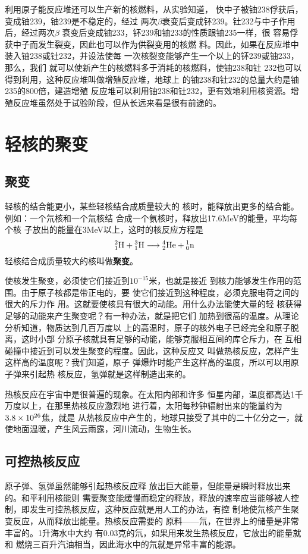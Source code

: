 利用原子能反应堆还可以生产新的核燃料，从实验知道，
快中子被铀238俘获后，变成铀239，铀239是不稳定的，经过
两次$\beta$衰变后变成钚239。钍232与中子作用后，经过两次$\beta$
衰变后变成铀233，钚239和铀233的性质跟铀235一样，很
容易俘获中子而发生裂变，因此也可以作为供裂变用的核燃
料。因此，如果在反应堆中装入铀238或钍232，并设法使每
一次核裂变能够产生一个以上的钚239或铀233，那么，我们
就可以使新产生的核燃料多于消耗的核燃料，使铀238和钍
232也可以得到利用，这种反应堆叫做增殖反应堆，地球上
的铀238和钍232的总量大约是铀235的800倍，建造增殖
反应堆可以利用铀238和钍232，更有效地利用核资源。增
殖反应堆虽然处于试验阶段，但从长远来看是很有前途的。

\section{轻核的聚变}
\subsection{聚变}
轻核的结合能更小，某些轻核结合成质量较大的
核时，能释放出更多的结合能。例如：一个氘核和一个氚核结
合成一个氨核时，释放出17.6MeV的能量，平均每个核
子放出的能量在3MeV以上，这时的核反应方程是
\[\atom{H}{2}{1}+\atom{H}{3}{1}\longrightarrow \atom{He}{4}{2}+\atom{n}{1}{0} 
    \]
轻核结合成质量较大的核叫做\textbf{聚变}。

使核发生聚变，必须使它们接近到$10^{-15}$米，也就是接近
到核力能够发生作用的范围。由于原子核都是带正电的，要
使它们接近到这种程度，必须克服电荷之间的很大的斥力作
用。这就要使核具有很大的动能。用什么办法能使大量的轻
核获得足够的动能来产生聚变呢？有一种办法，就是把它们
加热到很高的温度。从理论分析知道，物质达到几百万度以
上的高温时，原子的核外电子已经完全和原子脱离，这时小部
分原子核就具有足够的动能，能够克服相互间的库仑斥力，在
互相碰撞中接近到可以发生聚变的程度。因此，这种反应又
叫做热核反应，怎样产生这样高的温度呢？我们知道，原子
弹爆炸时能产生这样高的温度，所以可以用原子弹来引起热
核反应，氢弹就是这样制造出来的。

热核反应在宇宙中是很普遍的现象。在太阳内部和许多
恒星内部，温度都高达1千万度以上，在那里热核反应激烈地
进行着，太阳每秒钟辐射出来的能量约为$3.8\x10^{26}$焦，就是
从热核反应中产生的，地球只接受了其中的二十亿分之一，就
使地面温暖，产生风云雨露，河川流动，生物生长。

\subsection{可控热核反应}

原子弹、氢弹虽然能够引起热核反应释
放出巨大能量，但能量是瞬时释放出来的。和平利用核能则
需要聚变能缓慢而稳定的释放，释放的速率应当能够被人控
制，即发生可控热核反应，这种反应就是用人工的办法，有控
制地使氘核产生聚变反应，从而释放出能量。热核反应需要的
原料——氘，在世界上的储量是非常丰富的。1升海水中大约
有0.03克的氘，如果用来发生热核反应，它放出的能量就和
燃烧三百升汽油相当，因此海水中的氘就是异常丰富的能源。

